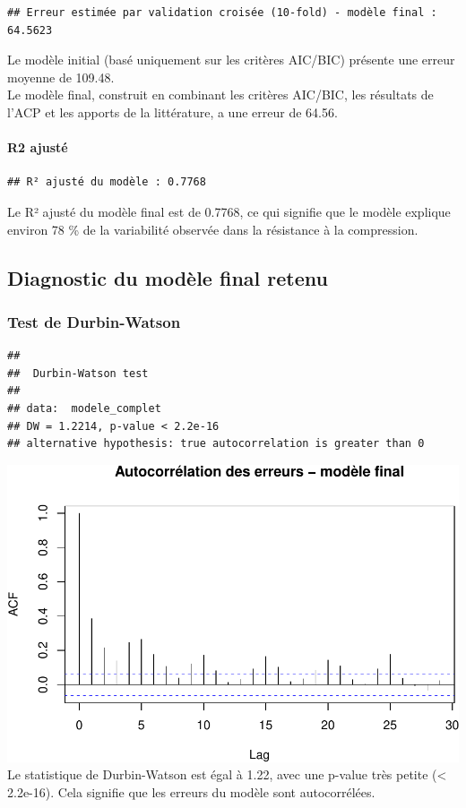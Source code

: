 \documentclass[
  12pt,
]{article}
\begin{document}
\begin{verbatim}
## Erreur estimée par validation croisée (10-fold) - modèle final : 64.5623
\end{verbatim}

Le modèle initial (basé uniquement sur les critères AIC/BIC) présente
une erreur moyenne de 109.48.\\
Le modèle final, construit en combinant les critères AIC/BIC, les
résultats de l'ACP et les apports de la littérature, a une erreur de
64.56.

\paragraph{R2 ajusté}\label{r2-ajustuxe9}

\begin{verbatim}
## R² ajusté du modèle : 0.7768
\end{verbatim}

Le R² ajusté du modèle final est de 0.7768, ce qui signifie que le
modèle explique environ 78 \% de la variabilité observée dans la
résistance à la compression.

\subsection{Diagnostic du modèle final
retenu}\label{diagnostic-du-moduxe8le-final-retenu}

\subsubsection{Test de Durbin-Watson}\label{test-de-durbin-watson}

\begin{verbatim}
## 
##  Durbin-Watson test
## 
## data:  modele_complet
## DW = 1.2214, p-value < 2.2e-16
## alternative hypothesis: true autocorrelation is greater than 0
\end{verbatim}

\includegraphics{rmd_final_files/figure-latex/unnamed-chunk-57-1.pdf} Le
statistique de Durbin-Watson est égal à 1.22, avec une p-value très
petite (\textless{} 2.2e-16). Cela signifie que les erreurs du modèle
sont autocorrélées.
\end{document}
